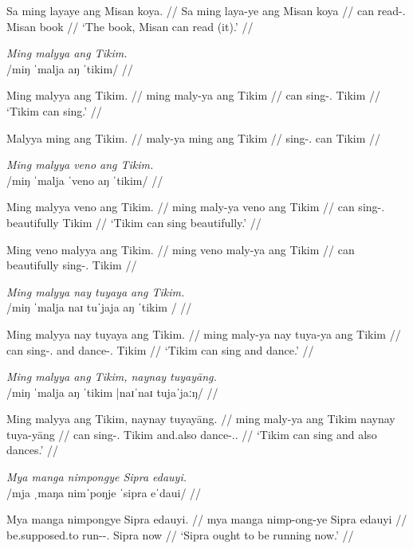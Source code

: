 \documentclass[12pt,a4paper]{scrartcl}
\newcommand{\TsgM}{{\Tsg}.{\M}}
\newcommand{\TsgF}{{\Tsg}.{\F}}
\begin{document}
\gla Sa ming layaye ang Misan koya. //
\glb Sa ming laya-ye ang Misan koya //
\glc \PatT{} can read-\TsgF{} \Aarg{} Misan book //
\glft `The book, Misan can read (it).' //
\endgl\xe

\pex
\a\begingl
\glpreamble \textit{Ming malyya ang Tikim.} \\
	/miŋ ˈmalja aŋ ˈtikim/ //

\gla Ming malyya ang Tikim. //
\glb ming maly-ya ang Tikim //
\glc can sing-\TsgM{} \Aarg{} Tikim //
\glft `Tikim can sing.' //
\endgl

\a\ljudge*\begingl
\gla Malyya ming ang Tikim. //
\glb maly-ya ming ang Tikim //
\glc sing-\TsgM{} can \Aarg{} Tikim //
\endgl
\xe

\pex
\a\begingl
\glpreamble \textit{Ming malyya veno ang Tikim.} \\
	/miŋ ˈmalja ˈveno aŋ ˈtikim/ //

\gla Ming malyya veno ang Tikim. //
\glb ming maly-ya veno ang Tikim //
\glc can sing-\TsgM{} beautifully \Aarg{} Tikim //
\glft `Tikim can sing beautifully.' //
\endgl

\a\ljudge*\begingl
\gla Ming veno malyya ang Tikim. //
\glb ming veno maly-ya ang Tikim //
\glc can beautifully sing-\TsgM{} \Aarg{} Tikim //
\endgl
\xe

\ex\begingl
\glpreamble \textit{Ming malyya nay tuyaya ang Tikim.} \\
	/miŋ ˈmalja naɪ tuˈjaja aŋ ˈtikim / //

\gla Ming malyya nay tuyaya ang Tikim. //
\glb ming maly-ya nay tuya-ya ang Tikim //
\glc can sing-\TsgM{} and dance-\TsgM{} \Aarg{} Tikim //
\glft `Tikim can sing and dance.' //
\endgl\xe

\ex\begingl
\glpreamble \textit{Ming malyya ang Tikim, naynay tuyayāng.} \\
	/miŋ ˈmalja aŋ ˈtikim |naɪˈnaɪ tujaˈjaːŋ/ //

\gla Ming malyya ang Tikim, naynay tuyayāng. //
\glb ming maly-ya ang Tikim naynay tuya-yāng //
\glc can sing-\TsgM{} \Aarg{} Tikim and.also dance-\TsgM{}.\Aarg{} //
\glft `Tikim can sing and also dances.' //
\endgl\xe

\ex\begingl
\glpreamble \textit{Mya manga nimpongye Sipra edauyi.} \\
	/mja ˌmaŋa nimˈpoŋje ˈsipra eˈdaui/ //

\gla Mya manga nimpongye Sipra edauyi. //
\glb mya manga nimp-ong-ye Sipra edauyi //
\glc be.supposed.to \Prog{} run-\Irr{}-\TsgF{} Sipra now //
\glft `Sipra ought to be running now.' //
\endgl\xe
\end{document}

